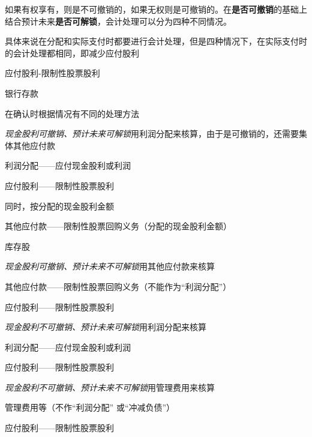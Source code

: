 \documentclass[UTF8,12pt]{ctexart}
\newenvironment{Dr}{%
	\begin{list}{}%
		{
			\setlength{\leftmargin}{2em}
			\setlength{\labelwidth}{2em}
			\setlength{\labelsep}{0pt}
			\setlength{\itemindent}{0pt}
			\setlength{\listparindent}{0pt}
			\setlength{\parsep}{0pt}
			\setlength{\topsep}{0pt}
		}
		\item[\textbf{借：}]
	}{%
	\end{list}
}
\newenvironment{Cr}{%
	\begin{list}{}%
		{
			\setlength{\leftmargin}{3em}
			\setlength{\labelwidth}{2em}
			\setlength{\labelsep}{0pt}
			\setlength{\itemindent}{0pt}
			\setlength{\listparindent}{0pt}
			\setlength{\parsep}{0pt}
			\setlength{\topsep}{0pt}
		}
		\item[\textbf{贷：}]
	}{%
	\end{list}
}
\numberwithin{equation}{section} %
\numberwithin{figure}{section}
\numberwithin{table}{section}
\begin{document}
	如果有权享有，则是不可撤销的，如果无权则是可撤销的。在\textbf{是否可撤销}的基础上结合预计未来\textbf{是否可解锁}，会计处理可以分为四种不同情况。
	
	具体来说在分配和实际支付时都要进行会计处理，但是四种情况下，在实际支付时的会计处理都相同，即减少应付股利
	\begin{Dr}
		应付股利-限制性股票股利
	\end{Dr}	
	\begin{Cr}
		银行存款
	\end{Cr}
	
	在确认时根据情况有不同的处理方法
	
	\textit{现金股利可撤销、预计未来可解锁}用利润分配来核算，由于是可撤销的，还需要集体其他应付款
	
	\begin{Dr}
		利润分配——应付现金股利或利润
	\end{Dr}
	\begin{Cr}
		应付股利——限制性股票股利
	\end{Cr}

	同时，按分配的现金股利金额

	\begin{Dr}
		其他应付款——限制性股票回购义务（分配的现金股利金额）
	\end{Dr}
	\begin{Cr}
		库存股
	\end{Cr}	
	
	\textit{现金股利可撤销、预计未来不可解锁}用其他应付款来核算
	
	\begin{Dr}
		其他应付款——限制性股票回购义务（不能作为“利润分配”）
	\end{Dr}
	\begin{Cr}
		应付股利——限制性股票股利
	\end{Cr}	
	
	\textit{现金股利不可撤销、预计未来可解锁}用利润分配来核算
	
	\begin{Dr}
		利润分配——应付现金股利或利润
	\end{Dr}
	\begin{Cr}
		应付股利——限制性股票股利
	\end{Cr}
	
	\textit{现金股利不可撤销、预计未来不可解锁}用管理费用来核算
	
	\begin{Dr}
		管理费用等（不作“利润分配” 或“冲减负债”）
	\end{Dr}
	\begin{Cr}
		应付股利——限制性股票股利
	\end{Cr}
	
\end{document}
